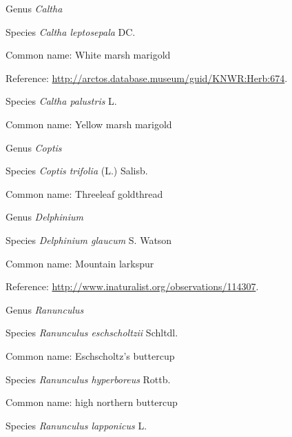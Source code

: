 \documentclass[9pt, article]{memoir}
\begin{document}
\begin{multicols}{2}
\vspace{6pt}\noindent\hspace{30pt}Genus \textit{Caltha}


\vspace{6pt}\noindent\hspace{36pt}Species \textit{Caltha leptosepala} DC.


Common name: White marsh marigold

Reference: 
\url{http://arctos.database.museum/guid/KNWR:Herb:674}.

\vspace{6pt}\noindent\hspace{36pt}Species \textit{Caltha palustris} L.


Common name: Yellow marsh marigold

\vspace{6pt}\noindent\hspace{30pt}Genus \textit{Coptis}


\vspace{6pt}\noindent\hspace{36pt}Species \textit{Coptis trifolia} (L.) Salisb.


Common name: Threeleaf goldthread

\vspace{6pt}\noindent\hspace{30pt}Genus \textit{Delphinium}


\vspace{6pt}\noindent\hspace{36pt}Species \textit{Delphinium glaucum} S. Watson


Common name: Mountain larkspur

Reference: 
\url{http://www.inaturalist.org/observations/114307}.

\vspace{6pt}\noindent\hspace{30pt}Genus \textit{Ranunculus}


\vspace{6pt}\noindent\hspace{36pt}Species \textit{Ranunculus eschscholtzii} Schltdl.


Common name: Eschscholtz's buttercup

\vspace{6pt}\noindent\hspace{36pt}Species \textit{Ranunculus hyperboreus} Rottb.


Common name: high northern buttercup

\vspace{6pt}\noindent\hspace{36pt}Species \textit{Ranunculus lapponicus} L.



\end{multicols}
\end{document}
